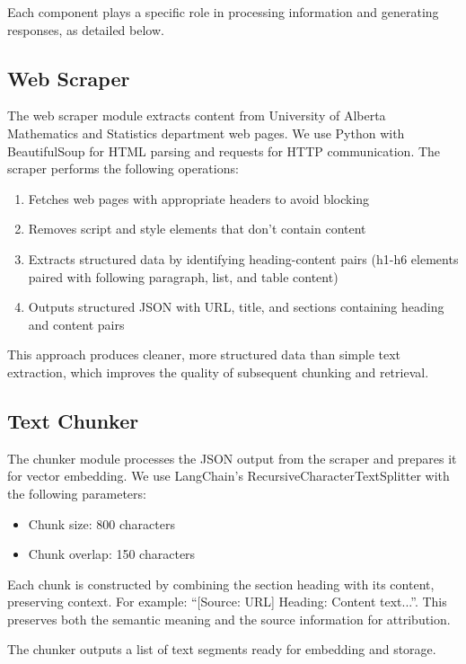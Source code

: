 \documentclass[conference]{IEEEtran}
\begin{document}
Each component plays a specific role in processing information and generating responses, as detailed below.

\subsection{Web Scraper}
The web scraper module extracts content from University of Alberta Mathematics and Statistics department web pages. We use Python with BeautifulSoup for HTML parsing and requests for HTTP communication. The scraper performs the following operations:

\begin{enumerate}
    \item Fetches web pages with appropriate headers to avoid blocking
    \item Removes script and style elements that don't contain content
    \item Extracts structured data by identifying heading-content pairs (h1-h6 elements paired with following paragraph, list, and table content)
    \item Outputs structured JSON with URL, title, and sections containing heading and content pairs
\end{enumerate}

This approach produces cleaner, more structured data than simple text extraction, which improves the quality of subsequent chunking and retrieval.

\subsection{Text Chunker}
The chunker module processes the JSON output from the scraper and prepares it for vector embedding. We use LangChain's RecursiveCharacterTextSplitter with the following parameters:

\begin{itemize}
    \item Chunk size: 800 characters
    \item Chunk overlap: 150 characters
\end{itemize}

Each chunk is constructed by combining the section heading with its content, preserving context. For example: ``[Source: URL] Heading: Content text...''. This preserves both the semantic meaning and the source information for attribution.

The chunker outputs a list of text segments ready for embedding and storage.
\end{document}
